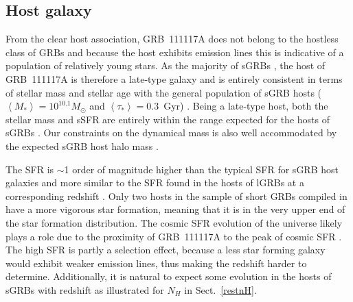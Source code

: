 \documentclass{aa}    %
\begin{document}
\subsection{Host galaxy}

From the clear host association, GRB~111117A does not belong to the hostless
class of GRBs \citep{Berger2010a} and because the host exhibits emission lines
this is indicative of a population of relatively young stars. As the majority of
sGRBs \citep{Fong2013b}, the host of GRB~111117A is therefore a late-type galaxy
and is entirely consistent in terms of stellar mass and stellar age with the
general population of sGRB hosts ($\left\langle M _* \right\rangle = 10^{10.1}
M_{\odot}$ and $\left\langle \tau _* \right\rangle = 0.3 $~Gyr)
\citep{Leibler2010}. Being a late-type host, both the stellar mass and sSFR are
entirely within the range expected for the hosts of sGRBs \citep{Behroozi2014}.
Our constraints on the dynamical mass is also well accommodated by the expected sGRB
host halo mass \citep{Behroozi2014}.

The SFR is $\sim$1 order of magnitude higher than the typical SFR for sGRB host
galaxies \citep{Berger2014} and more similar to the SFR found in the hosts of
lGRBs at a corresponding redshift \citep{Kruhler2015}. Only two hosts in the
sample of short GRBs compiled in \citet{Berger2014} have a more vigorous star
formation, meaning that it is in the very upper end of the star formation
distribution. The cosmic SFR evolution of the universe likely plays a role due
to the proximity of GRB~111117A to the peak of cosmic SFR \citep{Madau2014}.
The high SFR is partly a selection effect, because a less star forming galaxy
would exhibit weaker emission lines, thus making the redshift harder to
determine. Additionally, it is natural to expect some evolution in the hosts of
sGRBs with redshift as illustrated for $N_H$ in Sect.~\ref{restnH}.
\end{document}
